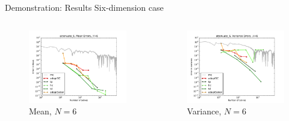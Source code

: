 \documentclass[t,9pt,svgnames]{beamer}
\begin{document}
\begin{frame}{Demonstration: Results}
  Six-dimension case
  \begin{columns}
    \begin{column}{0.5\textwidth}
      \begin{figure}
        \centering
        \includegraphics[width=\linewidth]{../../inputs/paul/attenuate_6_mean_errs}
        \caption{Mean, $N=6$}
      \end{figure}
    \end{column}
    \begin{column}{0.5\textwidth}
      \begin{figure}
        \centering
        \includegraphics[width=\linewidth]{../../inputs/paul/attenuate_6_variance_errs}
        \caption{Variance, $N=6$}
      \end{figure}
    \end{column}
  \end{columns}
\end{frame}
\end{document}
